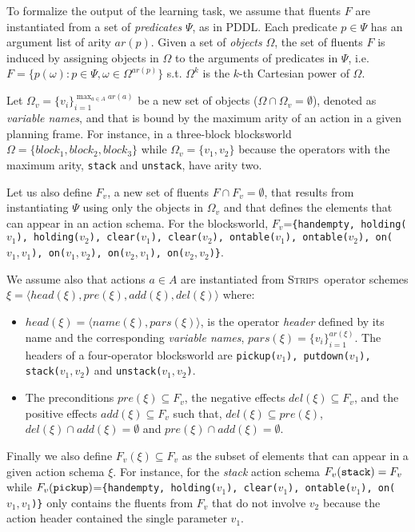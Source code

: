 \documentclass{article}
\newcommand{\tup}[1]{{\langle #1 \rangle}}
\newcommand{\strips}{\textsc{Strips}}     %
\begin{document}
To formalize the output of the learning task, we assume that fluents $F$ are instantiated from a set of {\em predicates} $\Psi$, as in PDDL. Each predicate $p\in\Psi$ has an argument list of arity $ar(p)$. Given a set of {\em objects} $\Omega$, the set of fluents $F$ is induced by assigning objects in $\Omega$ to the arguments of predicates in $\Psi$, i.e.~$F=\{p(\omega):p\in\Psi,\omega\in\Omega^{ar(p)}\}$ s.t. $\Omega^k$ is the $k$-th Cartesian power of $\Omega$.

Let $\Omega_v=\{v_i\}_{i=1}^{\operatorname*{max}_{a\in A} ar(a)}$ be a new set of objects ($\Omega\cap\Omega_v=\emptyset$), denoted as {\em variable names}, and that is bound by the maximum arity of an action in a given planning frame. For instance, in a three-block blocksworld $\Omega=\{block_1, block_2, block_3\}$ while $\Omega_v=\{v_1, v_2\}$ because the operators with the maximum arity, {\small\tt stack} and {\small\tt unstack}, have arity two.

Let us also define $F_v$, a new set of fluents $F\cap F_v=\emptyset$, that results from instantiating $\Psi$ using only the objects in $\Omega_v$ and that defines the elements that can appear in an action schema. For the blocksworld, $F_v$={\small\tt\{handempty, holding($v_1$), holding($v_2$), clear($v_1$), clear($v_2$), ontable($v_1$), ontable($v_2$), on($v_1,v_1$), on($v_1,v_2$), on($v_2,v_1$), on($v_2,v_2$)\}}.

We assume also that actions $a\in A$ are instantiated from \strips\ operator schemes $\xi=\tup{head(\xi),pre(\xi),add(\xi),del(\xi)}$ where:
\begin{itemize}
\item $head(\xi)=\tup{name(\xi),pars(\xi)}$, is the operator {\em header} defined by its name and the corresponding {\em variable names}, $pars(\xi)=\{v_i\}_{i=1}^{ar(\xi)}$. The headers of a four-operator blocksworld are {\small\tt pickup($v_1$), putdown($v_1$), stack($v_1,v_2$)} and {\small\tt unstack($v_1,v_2$)}.
\item The preconditions $pre(\xi)\subseteq F_v$, the negative effects $del(\xi)\subseteq F_v$, and the positive effects $add(\xi)\subseteq F_v$ such that, $del(\xi)\subseteq pre(\xi)$, $del(\xi)\cap add(\xi)=\emptyset$ and $pre(\xi)\cap add(\xi)=\emptyset$.
\end{itemize}

Finally we also define $F_v(\xi)\subseteq F_v$ as the subset of elements that can appear in a given action schema $\xi$. For instance, for the {\em stack} action schema $F_v({\tt stack})=F_v$ while $F_v({\tt pickup})$={\small\tt\{handempty, holding($v_1$), clear($v_1$), ontable($v_1$), on($v_1,v_1$)\}} only contains the fluents from $F_v$ that do not involve $v_2$ because the action header contained the single parameter $v_1$.
\end{document}
